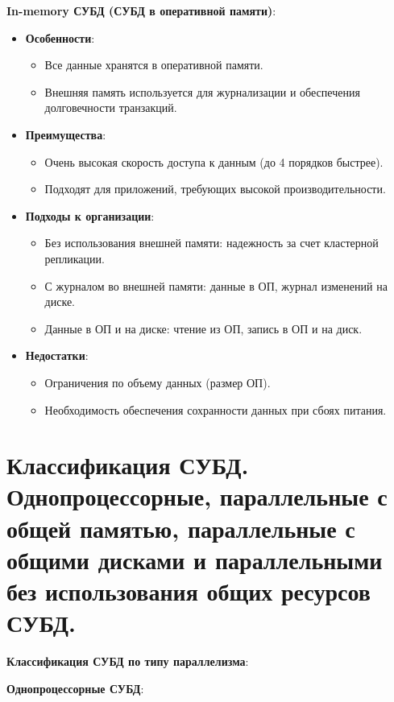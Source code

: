 \documentclass[a4paper,12pt]{article}
\begin{document}
\textbf{In-memory СУБД (СУБД в оперативной памяти)}:

\begin{itemize}
    \item \textbf{Особенности}:
    \begin{itemize}
        \item Все данные хранятся в оперативной памяти.
        \item Внешняя память используется для журнализации и обеспечения долговечности транзакций.
    \end{itemize}
    \item \textbf{Преимущества}:
    \begin{itemize}
        \item Очень высокая скорость доступа к данным (до 4 порядков быстрее).
        \item Подходят для приложений, требующих высокой производительности.
    \end{itemize}
    \item \textbf{Подходы к организации}:
    \begin{itemize}
        \item Без использования внешней памяти: надежность за счет кластерной репликации.
        \item С журналом во внешней памяти: данные в ОП, журнал изменений на диске.
        \item Данные в ОП и на диске: чтение из ОП, запись в ОП и на диск.
    \end{itemize}
    \item \textbf{Недостатки}:
    \begin{itemize}
        \item Ограничения по объему данных (размер ОП).
        \item Необходимость обеспечения сохранности данных при сбоях питания.
    \end{itemize}
\end{itemize}




\section{Классификация СУБД. Однопроцессорные, параллельные с общей памятью, параллельные с общими дисками и параллельными без использования общих ресурсов СУБД.}

\textbf{Классификация СУБД по типу параллелизма}:

\textbf{Однопроцессорные СУБД}:
\end{document}

